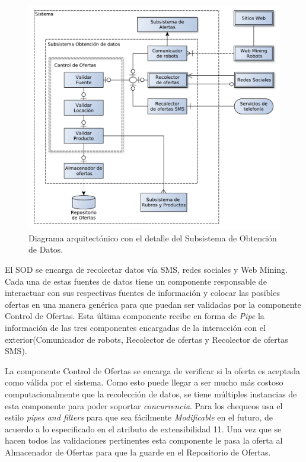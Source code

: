 \begin{figure}[H]
	\centering
	\includegraphics[width=\textwidth]{graficos/arch/Sistema_obtenedor_datos.pdf}
	\caption{Diagrama arquitectónico con el detalle del \textsf{Subsistema de Obtención de Datos}.}
\end{figure}

El SOD se encarga de recolectar datos vía SMS, redes sociales y Web Mining. Cada una de estas fuentes de datos tiene un componente responsable de interactuar con sus respectivas fuentes de información y colocar las posibles ofertas en una manera genérica para que puedan ser validadas por la componente \textsf{Control de Ofertas}. Esta última componente recibe en forma de \emph{Pipe} la información de las tres componentes encargadas de la interacción con el exterior(\textsf{Comunicador de robots}, \textsf{Recolector de ofertas} y \textsf{Recolector de ofertas SMS}).
 \vspace{9pt} 


La componente \textsf{Control de Ofertas} se encarga de verificar si la oferta es aceptada como válida por el sistema. Como esto puede llegar a ser mucho más costoso computacionalmente que la recolección de datos, se tiene múltiples instancias de esta componente para poder soportar \emph{concurrencia}. Para los chequeos usa el estilo \emph{pipes and filters} para que sea fácilmente \emph{Modificable} en el futuro, de acuerdo a lo especificado en el atributo de extensibilidad 11. Una vez que se hacen todos las validaciones pertinentes esta componente le pasa la oferta al \textsf{Almacenador de Ofertas} para que la guarde en el \textsf{Repositorio de Ofertas}.
 \vspace{9pt} 

